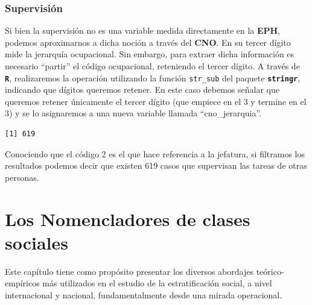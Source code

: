 \documentclass[
]{article}
\newenvironment{Shaded}{\begin{snugshade}}{\end{snugshade}}
\newcommand{\AttributeTok}[1]{\textcolor[rgb]{0.13,0.29,0.53}{#1}}
\newcommand{\DecValTok}[1]{\textcolor[rgb]{0.00,0.00,0.81}{#1}}
\newcommand{\FunctionTok}[1]{\textcolor[rgb]{0.13,0.29,0.53}{\textbf{#1}}}
\newcommand{\NormalTok}[1]{#1}
\newcommand{\OtherTok}[1]{\textcolor[rgb]{0.56,0.35,0.01}{#1}}
\newcommand{\SpecialCharTok}[1]{\textcolor[rgb]{0.81,0.36,0.00}{\textbf{#1}}}
\begin{document}
\hypertarget{supervisiuxf3n-1}{%
\subsubsection{Supervisión}\label{supervisiuxf3n-1}}

Si bien la supervisión no es una variable medida directamente en la \textbf{EPH}, podemos aproximarnos a dicha noción a través del \textbf{CNO}. En su tercer dígito mide la jerarquía ocupacional. Sin embargo, para extraer dicha información es necesario ``partir'' el código ocupacional, reteniendo el tercer dígito. A través de \textbf{\texttt{R}}, realizaremos la operación utilizando la función \texttt{str\_sub} del paquete \textbf{\texttt{stringr}}, indicando que dígitos queremos retener. En este caso debemos señalar que queremos retener únicamente el tercer dígito (que empiece en el 3 y termine en el 3) y se lo asignaremos a una nueva variable llamada ``cno\_jerarquia''.

\begin{Shaded}
\end{Shaded}

\begin{verbatim}
[1] 619
\end{verbatim}

Conociendo que el código 2 es el que hace referencia a la jefatura, si filtramos los resultados podemos decir que existen 619 casos que supervisan las tareas de otras personas.

\hypertarget{clases5}{%
\section{Los Nomencladores de clases sociales}\label{clases5}}

Este capítulo tiene como propósito presentar los diversos abordajes teórico-empíricos más utilizados en el estudio de la estratificación social, a nivel internacional y nacional, fundamentalmente desde una mirada operacional.
\end{document}
